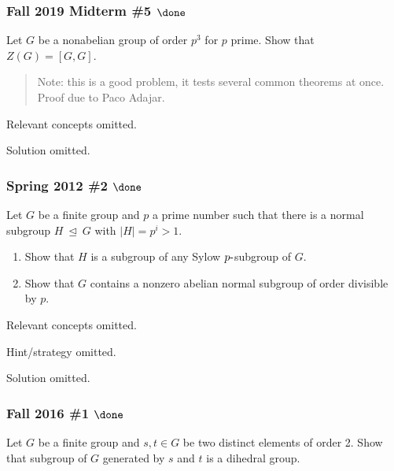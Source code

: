 \hypertarget{fall-2019-midterm-5-done}{%
\subsubsection{\texorpdfstring{Fall 2019 Midterm \#5
\(\done\)}{Fall 2019 Midterm \#5 \textbackslash done}}\label{fall-2019-midterm-5-done}}

Let \(G\) be a nonabelian group of order \(p^3\) for \(p\) prime. Show
that \(Z(G) = [G, G]\).

\begin{quote}
Note: this is a good problem, it tests several common theorems at once.
Proof due to Paco Adajar.
\end{quote}

Relevant concepts omitted.

Solution omitted.

\hypertarget{spring-2012-2-done}{%
\subsubsection{\texorpdfstring{Spring 2012 \#2
\(\done\)}{Spring 2012 \#2 \textbackslash done}}\label{spring-2012-2-done}}

Let \(G\) be a finite group and \(p\) a prime number such that there is
a normal subgroup \(H{~\trianglelefteq~}G\) with
\({\left\lvert {H} \right\rvert} = p^i > 1\).

\begin{enumerate}
\def\labelenumi{\alph{enumi}.}
\item
  Show that \(H\) is a subgroup of any Sylow \(p{\hbox{-}}\)subgroup of
  \(G\).
\item
  Show that \(G\) contains a nonzero abelian normal subgroup of order
  divisible by \(p\).
\end{enumerate}

Relevant concepts omitted.

Hint/strategy omitted.

Solution omitted.

\hypertarget{fall-2016-1-done}{%
\subsubsection{\texorpdfstring{Fall 2016 \#1
\(\done\)}{Fall 2016 \#1 \textbackslash done}}\label{fall-2016-1-done}}

Let \(G\) be a finite group and \(s, t\in G\) be two distinct elements
of order 2. Show that subgroup of \(G\) generated by \(s\) and \(t\) is
a dihedral group.


